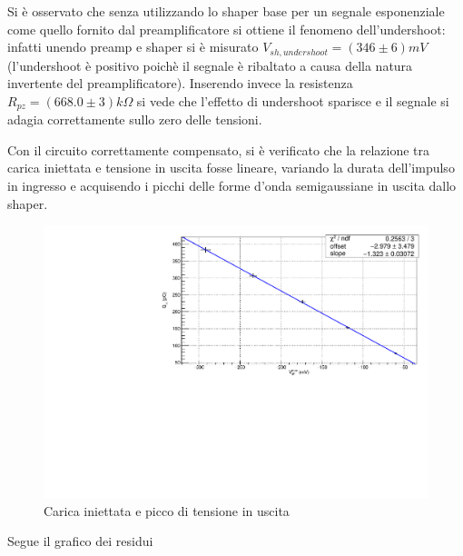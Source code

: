\documentclass{article}
\begin{document}
Si è osservato che senza utilizzando lo shaper base per un segnale esponenziale come quello fornito dal preamplificatore si ottiene il 
fenomeno dell'undershoot: infatti unendo preamp e shaper si è misurato $V_{sh, undershoot}=(346 \pm 6)mV$ (l'undershoot è positivo poichè
il segnale è ribaltato a causa della natura invertente del preamplificatore). Inserendo invece la resistenza 
$R_{pz} = (668.0 \pm 3) k\Omega$ si vede che l'effetto di undershoot sparisce e il segnale si adagia correttamente sullo zero 
delle tensioni.

Con il circuito correttamente compensato, si è verificato che la relazione tra carica iniettata e tensione in uscita fosse
lineare, variando la durata dell'impulso in ingresso e acquisendo i picchi delle forme d'onda semigaussiane in uscita dallo shaper.

\begin{center}
    \begin{figure}[H]
    \centering
    \includegraphics[scale=0.375, angle=0]{fitshaper.pdf}
    \caption{Carica iniettata e picco di tensione in uscita}
    \label{fig:fitshaper}
    \end{figure}
\end{center}

Segue il grafico dei residui
\end{document}
